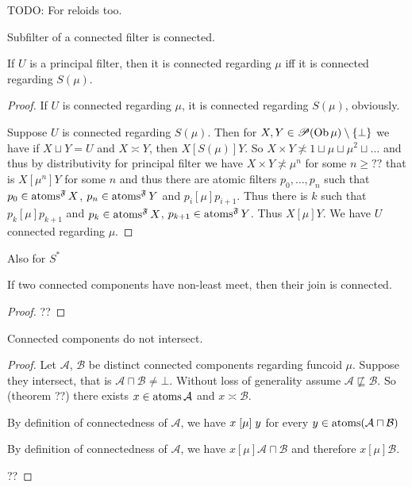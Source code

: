 TODO: For reloids too.

Subfilter of a connected filter is connected.

\begin{prop}
  If $U$ is a principal filter, then it is connected regarding $\mu$ iff it is
  connected regarding $S (\mu)$.
\end{prop}

\begin{proof}
  If $U$ is connected regarding $\mu$, it is connected regarding $S (\mu)$,
  obviously.

  Suppose $U$ is connected regarding $S (\mu)$. Then for $X, Y \in \mathscr{P}
  (\operatorname{Ob} \mu) \setminus \{ \bot \}$ we have if $X \sqcup Y = U$ and $X
  \asymp Y$, then $X \mathrel{[S (\mu)]} Y$. So $X \times Y \nasymp 1 \sqcup
  \mu \sqcup \mu^2 \sqcup \ldots$ and thus by distributivity for principal
  filter we have $X \times Y \nasymp \mu^n$ for some $n \geq ? ?$ that is $X
  \mathrel{[\mu^n]} Y$ for some $n$ and thus there are atomic filters $p_0,
  \ldots, p_n$ such that $p_0 \in \operatorname{atoms}^{\mathfrak{F}} X$, $p_n \in
  \operatorname{atoms}^{\mathfrak{F}} Y$ and $p_i \mathrel{[\mu]} p_{i + 1}$. Thus
  there is $k$ such that $p_k \mathrel{[\mu]} p_{k + 1}$ and $p_k \in
  \operatorname{atoms}^{\mathfrak{F}} X$, $p_{k + 1} \in \operatorname{atoms}^{\mathfrak{F}}
  Y$. Thus $X \mathrel{[\mu]} Y$. We have $U$ connected regarding $\mu$.
\end{proof}

Also for $S^{\ast}$

\begin{prop}
  If two connected components have non-least meet, then their join is
  connected.
\end{prop}

\begin{proof}
  ??
\end{proof}

\begin{prop}
  Connected components do not intersect.
\end{prop}

\begin{proof}
  Let $\mathcal{A}$, $\mathcal{B}$ be distinct connected components
  regarding funcoid $\mu$. Suppose they intersect, that
  is $\mathcal{A} \sqcap \mathcal{B} \neq \bot$. Without loss of generality
  assume $\mathcal{A} \nsqsubseteq \mathcal{B}$. So (theorem
  ??) there exists $x \in \operatorname{atoms} \mathcal{A}$ and $x \asymp
  \mathcal{B}$.

  By definition of connectedness of $\mathcal{A}$, we have $x\mathrel{\left[\mu\right]}y$
  for every $y\in\operatorname{atoms}(\mathcal{A}\sqcap\mathcal{B})$

  By definition of connectedness of $\mathcal{A}$, we have $x \mathrel{[\mu]}
  \mathcal{A} \sqcap \mathcal{B}$ and therefore $x \mathrel{[\mu]}
  \mathcal{B}$.

  ??
\end{proof}


